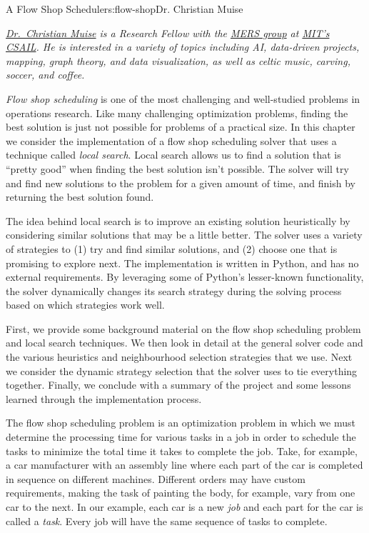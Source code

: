 \begin{aosachapter}{A Flow Shop Scheduler}{s:flow-shop}{Dr. Christian Muise}

\emph{\href{http://haz.ca}{Dr.~Christian Muise} is a Research Fellow
with the \href{http://groups.csail.mit.edu/mers/}{MERS group} at
\href{http://www.csail.mit.edu/}{MIT's CSAIL}. He is interested in a
variety of topics including AI, data-driven projects, mapping, graph
theory, and data visualization, as well as celtic music, carving,
soccer, and coffee.}

\label{a-flow-shop-scheduler}

\emph{Flow shop scheduling} is one of the most challenging and
well-studied problems in operations research. Like many challenging
optimization problems, finding the best solution is just not possible
for problems of a practical size. In this chapter we consider the
implementation of a flow shop scheduling solver that uses a technique
called \emph{local search}. Local search allows us to find a solution
that is ``pretty good'' when finding the best solution isn't possible.
The solver will try and find new solutions to the problem for a given
amount of time, and finish by returning the best solution found.

The idea behind local search is to improve an existing solution
heuristically by considering similar solutions that may be a little
better. The solver uses a variety of strategies to (1) try and find
similar solutions, and (2) choose one that is promising to explore next.
The implementation is written in Python, and has no external
requirements. By leveraging some of Python's lesser-known functionality,
the solver dynamically changes its search strategy during the solving
process based on which strategies work well.

First, we provide some background material on the flow shop scheduling
problem and local search techniques. We then look in detail at the
general solver code and the various heuristics and neighbourhood
selection strategies that we use. Next we consider the dynamic strategy
selection that the solver uses to tie everything together. Finally, we
conclude with a summary of the project and some lessons learned through
the implementation process.

\label{background}

\label{flow-shop-scheduling}

The flow shop scheduling problem is an optimization problem in which we
must determine the processing time for various tasks in a job in order
to schedule the tasks to minimize the total time it takes to complete
the job. Take, for example, a car manufacturer with an assembly line
where each part of the car is completed in sequence on different
machines. Different orders may have custom requirements, making the task
of painting the body, for example, vary from one car to the next. In our
example, each car is a new \emph{job} and each part for the car is
called a \emph{task}. Every job will have the same sequence of tasks to
complete.


\end{aosachapter}
